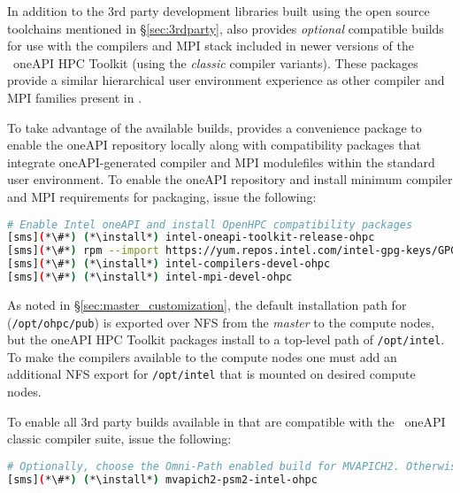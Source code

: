 In addition to the 3rd party development libraries built using the open source
toolchains mentioned in \S\ref{sec:3rdparty}, \OHPC{} also provides {\em
  optional} compatible builds for use with the compilers and MPI stack included
in newer versions of the \IntelR{}~oneAPI HPC Toolkit (using the {\em classic}
compiler variants).  These
packages provide a similar hierarchical user
environment experience as other compiler and MPI families present in \OHPC{}.

To take advantage of the available builds, \OHPC{} provides a convenience
package to enable the oneAPI repository locally along with compatibility
packages that integrate oneAPI-generated compiler and MPI modulefiles within
the standard \OHPC{} user environment. To enable the \IntelR{} oneAPI
repository and install minimum compiler and MPI requirements for \OHPC{}
packaging, issue the following:

\begin{lstlisting}[language=bash,keywords={},upquote=true,keepspaces]
# Enable Intel oneAPI and install OpenHPC compatibility packages
[sms](*\#*) (*\install*) intel-oneapi-toolkit-release-ohpc
[sms](*\#*) rpm --import https://yum.repos.intel.com/intel-gpg-keys/GPG-PUB-KEY-INTEL-SW-PRODUCTS.PUB
[sms](*\#*) (*\install*) intel-compilers-devel-ohpc
[sms](*\#*) (*\install*) intel-mpi-devel-ohpc
\end{lstlisting}


\begin{center}
\begin{tcolorbox}[]
As noted in \S\ref{sec:master_customization}, the default installation path for
\OHPC{} (\texttt{/opt/ohpc/pub}) is exported over NFS from the {\em master} to the 
compute nodes, but the \IntelR{} oneAPI HPC Toolkit packages install to a top-level path of 
\texttt{/opt/intel}. To make the \IntelR{} compilers available to the compute 
nodes one must add an additional NFS export
for \texttt{/opt/intel} that is mounted on desired compute nodes.
\end{tcolorbox}
\end{center}

\noindent To enable all 3rd party builds available in \OHPC{} that are compatible with
the \IntelR{}~oneAPI classic compiler suite, issue the following:


\begin{lstlisting}[language=bash,keywords={},upquote=true,keepspaces]
# Optionally, choose the Omni-Path enabled build for MVAPICH2. Otherwise, skip to retain IB variant
[sms](*\#*) (*\install*) mvapich2-psm2-intel-ohpc
\end{lstlisting}

